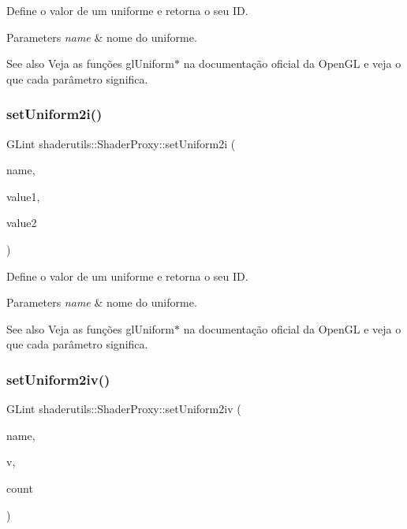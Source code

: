 Define o valor de um uniforme e retorna o seu ID. 
\begin{DoxyParams}{Parameters}
{\em name} & nome do uniforme. \\
\hline
\end{DoxyParams}
\begin{DoxySeeAlso}{See also}
Veja as funções gl\+Uniform$\ast$ na documentação oficial da Open\+GL e veja o que cada parâmetro significa. 
\end{DoxySeeAlso}
\mbox{\label{classshaderutils_1_1_shader_proxy_ab9b177faae584cefa917bc598902e7d1}} 
\subsubsection{\texorpdfstring{set\+Uniform2i()}{setUniform2i()}}
{\footnotesize\ttfamily G\+Lint shaderutils\+::\+Shader\+Proxy\+::set\+Uniform2i (\begin{DoxyParamCaption}\item[{const char $\ast$}]{name,  }\item[{G\+Lint}]{value1,  }\item[{G\+Lint}]{value2 }\end{DoxyParamCaption})\hspace{0.3cm}{\ttfamily [inline]}}

Define o valor de um uniforme e retorna o seu ID. 
\begin{DoxyParams}{Parameters}
{\em name} & nome do uniforme. \\
\hline
\end{DoxyParams}
\begin{DoxySeeAlso}{See also}
Veja as funções gl\+Uniform$\ast$ na documentação oficial da Open\+GL e veja o que cada parâmetro significa. 
\end{DoxySeeAlso}
\mbox{\label{classshaderutils_1_1_shader_proxy_aa06e5c62fda6ecb768f11c7cbef9775d}} 
\subsubsection{\texorpdfstring{set\+Uniform2iv()}{setUniform2iv()}}
{\footnotesize\ttfamily G\+Lint shaderutils\+::\+Shader\+Proxy\+::set\+Uniform2iv (\begin{DoxyParamCaption}\item[{const char $\ast$}]{name,  }\item[{const G\+Lint $\ast$}]{v,  }\item[{G\+Luint}]{count }\end{DoxyParamCaption})\hspace{0.3cm}{\ttfamily [inline]}}

